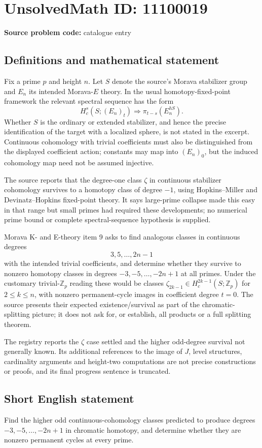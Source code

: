 \documentclass[11pt]{article}
\newcommand{\Z}{\mathbb{Z}}
\begin{document}
\section*{UnsolvedMath ID: 11100019}
\textbf{Source problem code:} catalogue entry
\subsection{Definitions and mathematical statement}
Fix a prime $p$ and height $n$. Let $S$ denote the source's Morava stabilizer group and $E_n$ its intended Morava-$E$ theory. In the usual homotopy-fixed-point framework the relevant spectral sequence has the form
\[
 H_c^s(S;(E_n)_t)\Longrightarrow\pi_{t-s}(E_n^{hS}).
\]
Whether $S$ is the ordinary or extended stabilizer, and hence the precise identification of the target with a localized sphere, is not stated in the excerpt. Continuous cohomology with trivial coefficients must also be distinguished from the displayed coefficient action; constants may map into $(E_n)_0$, but the induced cohomology map need not be assumed injective.

The source reports that the degree-one class $\zeta$ in continuous stabilizer cohomology survives to a homotopy class of degree $-1$, using Hopkins--Miller and Devinatz--Hopkins fixed-point theory. It says large-prime collapse made this easy in that range but small primes had required these developments; no numerical prime bound or complete spectral-sequence hypothesis is supplied.

Morava K- and E-theory item 9 asks to find analogous classes in continuous degrees
\[
 3,5,\ldots,2n-1
\]
with the intended trivial coefficients, and determine whether they survive to nonzero homotopy classes in degrees $-3,-5,\ldots,-2n+1$ at all primes. Under the customary trivial-$\Z_p$ reading these would be classes $\zeta_{2k-1}\in H_c^{2k-1}(S;\Z_p)$ for $2\leq k\leq n$, with nonzero permanent-cycle images in coefficient degree $t=0$. The source presents their expected existence/survival as part of the chromatic-splitting picture; it does not ask for, or establish, all products or a full splitting theorem.

The registry reports the $\zeta$ case settled and the higher odd-degree survival not generally known. Its additional references to the image of $J$, level structures, cardinality arguments and height-two computations are not precise constructions or proofs, and its final progress sentence is truncated.
\subsection{Short English statement}
Find the higher odd continuous-cohomology classes predicted to produce degrees $-3,-5,\ldots,-2n+1$ in chromatic homotopy, and determine whether they are nonzero permanent cycles at every prime.
\end{document}
